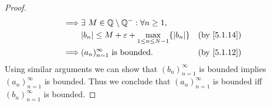 \begin{proof}
\begin{align*}
    \implies & \exists\ M \in \Q \setminus \Q^- : \forall n \geq 1,                                                                          \\
             & \abs{b_n} \leq M + \varepsilon + \max_{1 \leq n \leq N - 1}\{\abs{b_n}\}                     & \text{(by \cref{5.1.14})}      \\
    \implies & (a_n)_{n = 1}^\infty \text{ is bounded}.                                                     & \text{(by \cref{5.1.12})}
  \end{align*}
  Using similar arguments we can show that \((b_n)_{n = 1}^\infty\) is bounded implies \((a_n)_{n = 1}^\infty\) is bounded.
  Thus we conclude that \((a_n)_{n = 1}^\infty\) is bounded iff \((b_n)_{n = 1}^\infty\) is bounded.
\end{proof}